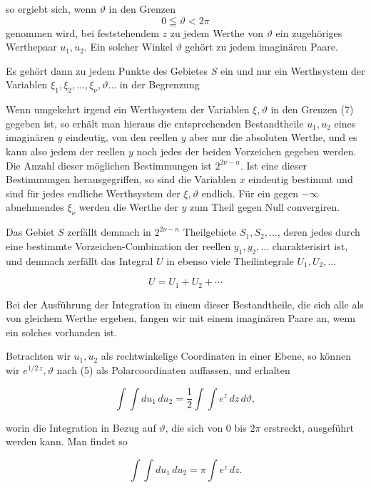 so ergiebt sich, wenn $\vartheta$ in den Grenzen
\[
0 \leqq \vartheta < 2\pi
\]
genommen wird, bei feststehendem $z$ zu jedem Werthe von $\vartheta$ ein zugehöriges Werthepaar $u_1, u_2$. Ein solcher Winkel $\vartheta$ gehört zu jedem imaginären Paare.

Es gehört dann zu jedem Punkte des Gebietes $S$ ein und nur ein Werthsystem der Variablen $\xi_1, \xi_2, \ldots, \xi_\nu, \vartheta \ldots$ in der Begrenzung


Wenn umgekehrt irgend ein Werthsystem der Variablen $\xi, \vartheta$ in den Grenzen (7) gegeben ist, so erhält man hieraus die entsprechenden Bestandtheile $u_1, u_2$ eines imaginären $y$ eindeutig, von den reellen $y$ aber nur die absoluten Werthe, und es kann also jedem der reellen $y$ noch jedes der beiden Vorzeichen gegeben werden. Die Anzahl dieser möglichen Bestimmungen ist $2^{2\nu-n}$. Ist eine dieser Bestimmungen herausgegriffen, so sind die Variablen $x$ eindeutig bestimmt und sind für jedes endliche Werthsystem der $\xi, \vartheta$ endlich. Für ein gegen $-\infty$ abnehmendes $\xi_\nu$ werden die Werthe der $y$ zum Theil gegen Null convergiren.

Das Gebiet $S$ zerfällt demnach in $2^{2\nu-n}$ Theilgebiete $S_1, S_2, \ldots$, deren jedes durch eine bestimmte Vorzeichen-Combination der reellen $y_1, y_2, \ldots$ charakterisirt ist, und demnach zerfällt das Integral $U$ in ebenso viele Theilintegrale $U_1, U_2, \ldots$

\[
U = U_1+U_2+\cdots
\]

Bei der Ausführung der Integration in einem dieser Bestandtheile, die sich alle als von gleichem Werthe ergeben, fangen wir mit einem imaginären Paare an, wenn ein solches vorhanden ist.

Betrachten wir $u_1, u_2$ als rechtwinkelige Coordinaten in einer Ebene, so können wir $e^{1/2\,z}, \vartheta$ nach (5) als Polarcoordinaten auffassen, und erhalten

\[
\int\int du_1\,du_2 = \frac12\int\int e^z\,dz\,d\vartheta,
\]

worin die Integration in Bezug auf $\vartheta$, die sich von $0$ bis $2\pi$ erstreckt, ausgeführt werden kann. Man findet so

\[
\int\int du_1\,du_2 = \pi\int e^z\,dz.
\]
